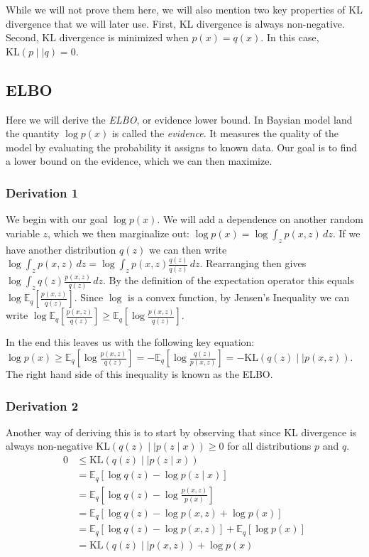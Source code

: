 \documentclass[11pt,dvipsnames]{article}
\begin{document}
While we will not prove them here, we will also mention two key properties of KL divergence that we will later use.
First, KL divergence is always non-negative. Second, KL divergence is minimized when $p(x) = q(x)$. In this case,
$\text{KL}(p \mid\mid q) = 0$.

\subsection{ELBO}
Here we will derive the \emph{ELBO}, or evidence lower bound.
In Baysian model land the quantity $\log p(x)$ is called the \emph{evidence}.
It measures the quality of the model by evaluating the probability it assigns to known data.
Our goal is to find a lower bound on the evidence, which we can then maximize.

\subsubsection{Derivation 1}
We begin with our goal $\log p(x)$. We will add a dependence on another random variable $z$, which
we then marginalize out: $\log p(x) = \log \int_z p(x, z) \, dz$. If we have another distribution $q(z)$
we can then write $\log \int_z p(x, z) \, dz = \log \int_z p(x, z) \frac{q(z)}{q(z)} \, dz$.
Rearranging then gives $\log \int_z q(z) \frac{p(x, z)}{q(z)} \, dz$.
By the definition of the expectation operator this equals $\log \mathbb{E}_q \left[ \frac{p(x, z)}{q(z)} \right]$.
Since $\log$ is a convex function, by Jensen's Inequality we can write
$\log \mathbb{E}_q \left[ \frac{p(x, z)}{q(z)} \right] \ge \mathbb{E}_q \left[ \log \frac{p(x, z)}{q(z)} \right]$.

In the end this leaves us with the following key equation:
$\log p(x) \ge \mathbb{E}_q \left[ \log \frac{p(x, z)}{q(z)} \right] = -\mathbb{E}_q \left[ \log \frac{q(z)}{p(x, z)} \right] = -\text{KL}(q(z) \mid\mid p(x, z))$.
The right hand side of this inequality is known as the ELBO.

\subsubsection{Derivation 2}
Another way of deriving this is to start by observing that since KL divergence is always non-negative
$\text{KL}(q(z) \mid\mid p(z \mid x)) \ge 0$ for all distributions $p$ and $q$.
\begin{equation*}
\begin{split}
0 &\le \text{KL}(q(z) \mid\mid p(z \mid x)) \\
& = \mathbb{E}_q \left[\log q(z) - \log p(z \mid x)\right] \\
& = \mathbb{E}_q \left[\log q(z) - \log \frac{p(x, z)}{p(x)} \right] \\
& = \mathbb{E}_q \left[\log q(z) - \log p(x, z) + \log p(x)\right] \\
& = \mathbb{E}_q \left[\log q(z) - \log p(x, z)\right] + \mathbb{E}_q \left[ \log p(x) \right]\\
& = \text{KL}(q(z) \mid\mid p(x, z)) + \log p(x) \\
\end{split}
\end{equation*}
\end{document}
